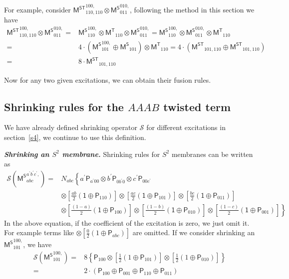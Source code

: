 \documentclass[11pt,nofootinbib,preprint]{revtex4-1}
\begin{document}
For example, consider $\mathsf{M^{ST}}_{110,110}^{100,}\otimes \mathsf{M^S}_{011}^{010,}$, following the method in this section we have 
\begin{align}
	\mathsf{M^{ST}}_{110,110}^{100,}\otimes \mathsf{M^S}_{011}^{010,}=&\mathsf{M^S}_{110}^{100,}\otimes \mathsf{M^T}_{110}\otimes \mathsf{M^S}_{011}^{010,}=\mathsf{M^S}_{110}^{100,}\otimes \mathsf{M^S}_{011}^{010,}\otimes \mathsf{M^T}_{110} \nonumber
	\\
	=&4\cdot \left( \mathsf{M^S}_{101}^{100,}\oplus \mathsf{M^S}_{101} \right) \otimes \mathsf{M^T}_{110}=4\cdot \left( \mathsf{M^{ST}}_{101,110}\oplus \mathsf{M^{ST}}_{101,110} \right) \nonumber
	\\
	=&8\cdot \mathsf{M^{ST}}_{101,110}
\end{align}

Now for any two given excitations, we can obtain their fusion rules. 
\subsection{Shrinking rules for the $AAAB$ twisted term}
We have already defined shrinking operator $\mathcal{S}$ for different excitations in section~\ref{s4}, we continue to use this definition. 

\textbf{\textit{Shrinking an $S^2$ membrane.}}
Shrinking rules for $S^2$ membranes can be written as 
\begin{align}
	\mathcal{S} \left( \mathsf{M^S}_{abc}^{a^{\prime}b^{\prime}c^{\prime},} \right) =&N_{abc}\left\{ a^{\prime}\mathsf{P}_{a^{\prime}00}\otimes b^{\prime}\mathsf{P}_{0b^{\prime}0}\otimes c^{\prime}\mathsf{P}_{00c^{\prime}} \right. \nonumber
	\\
	&\otimes \left[ \frac{ab}{2}\left( \mathsf{1}\oplus \mathsf{P}_{110} \right) \right] \otimes \left[ \frac{ac}{2}\left( \mathsf{1}\oplus \mathsf{P}_{101} \right) \right] \otimes \left[ \frac{bc}{2}\left( \mathsf{1}\oplus \mathsf{P}_{011} \right) \right] \nonumber
	\\
	&\left. \otimes \left[ \frac{\left( 1-a \right)}{2}\left( \mathsf{1}\oplus \mathsf{P}_{100} \right) \right] \otimes \left[ \frac{\left( 1-b \right)}{2}\left( \mathsf{1}\oplus \mathsf{P}_{010} \right) \right] \otimes \left[ \frac{\left( 1-c \right)}{2}\left( \mathsf{1}\oplus \mathsf{P}_{001} \right) \right] \right\} 
\end{align}
In the above equation, if the coefficient of the excitation is zero, we just omit it. For example terms like $\otimes \left[ \frac{0}{2}\left( 1\oplus \mathsf{P}_{abc} \right) \right] $ are omitted. If we consider shrinking an $\mathsf{M^S}_{101}^{100,}$, we have 
\begin{align}
	\mathcal{S} \left( {\mathsf{M}^{\mathsf{S}}}_{101}^{100,} \right) =&8\left\{ \mathsf{P}_{100}\otimes \left[ \frac{1}{2}\left( 1\oplus \mathsf{P}_{101} \right) \right] \otimes \left[ \frac{1}{2}\left( 1\oplus \mathsf{P}_{010} \right) \right] \right\} \nonumber
	\\
	=&2\cdot \left( \mathsf{P}_{100}\oplus \mathsf{P}_{001}\oplus \mathsf{P}_{110}\oplus \mathsf{P}_{011} \right) 
\end{align}
\end{document}
